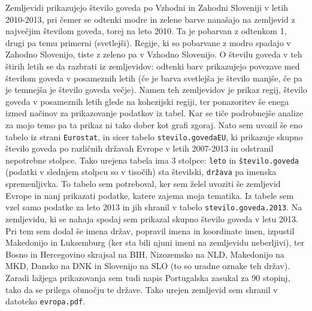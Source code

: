 \documentclass[11pt,a4paper]{article}
\begin{document}
\newline
\newline
Zemljevidi prikazujejo število goveda po Vzhodni in Zahodni Sloveniji v letih 2010-2013, pri čemer se odtenki modre in zelene barve nanašajo na zemljevid z največjim številom goveda, torej na leto 2010. Ta je pobarvan z odtenkom 1, drugi pa temu primerni (svetlejši). Regije, ki so pobarvane z modro spadajo v Zahodno Slovenijo, tiste z zeleno pa v Vzhodno Slovenijo. O številu goveda v teh štirih letih se da razbrati iz zemljevidov: odtenki barv prikazujejo povezave med številom goveda v posameznih letih (če je barva svetlejša je število manjše, če pa je temnejša je število goveda večje).
Namen teh zemljevidov je prikaz regij, število goveda v posameznih letih glede na kohezijski regiji, ter ponazoritev še enega izmed načinov za prikazovanje podatkov iz tabel. Kar se tiče podrobnejše analize za mojo temo pa ta prikaz ni tako dober kot grafi zgoraj.
\newline
\newline
\noindent Nato sem uvozil še eno tabelo iz strani \verb|Eurostat|, in sicer tabelo \texttt{stevilo.go\-vedaEU}, ki prikazuje skupno število goveda po različnih državah Evrope v letih 2007-2013 in odstranil nepotrebne stolpce. Tako urejena tabela ima 3 stolpce: \verb|leto| in \verb|število.goveda| (podatki v slednjem stolpcu so v tisočih) sta številski, \verb|država| pa imenska spremenljivka. To tabelo sem potreboval, ker sem želel uvoziti še zemljevid Evrope in nanj prikazati podatke, katere zajema moja tematika. Iz tabele sem vzel samo podatke za leto 2013 in jih shranil v tabelo \verb|stevilo.goveda.2013|.
\newline Na zemljevidu, ki se nahaja spodaj sem prikazal skupno število goveda v letu 2013. Pri tem sem dodal še imena držav, popravil imena in  koordinate imen, izpustil Makedonijo in Luksemburg (ker sta bili njuni imeni na zemljevidu neberljivi), ter Bosno in Hercegovino skrajsal na BIH, Nizozemsko na NLD, Makedonijo na MKD, Dansko na DNK in Slovenijo na SLO (to so uradne oznake teh držav). Zaradi lažjega prikazovanja sem tudi napis Portugalska zasukal za 90 stopinj, tako da se prilega območju te države. Tako urejen zemljevid sem shranil v datoteko \verb|evropa.pdf|.

\end{document}
